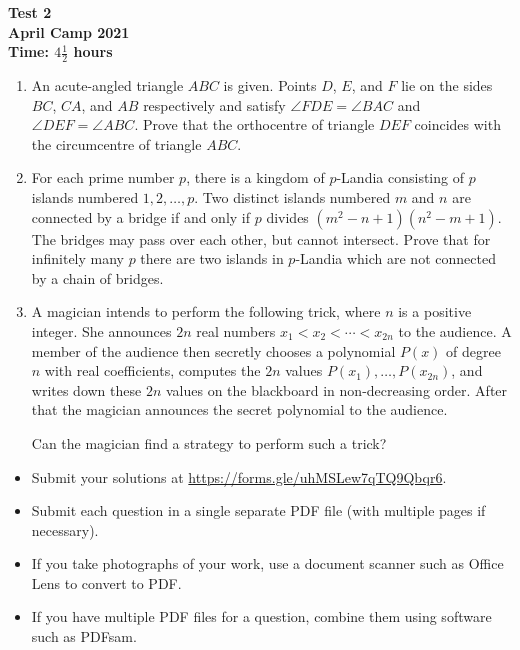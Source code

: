 \documentclass{article}
\begin{document}
\thispagestyle{empty}

\begin{center}
  \textbf{\Large Test 2}
  \\ \vspace{1em}
  \textbf{\large April Camp 2021}
  \\ \vspace{1em}
  \textbf{\large Time: $4\frac{1}{2}$ hours}
\end{center}

\vfill

\begin{enumerate}[leftmargin=0pt, itemsep=18pt]

\item %
An acute-angled triangle $ABC$ is given.
Points $D$, $E$, and $F$ lie on the sides $BC$, $CA$, and $AB$ respectively and satisfy $\angle FDE = \angle BAC$ and $\angle DEF = \angle ABC$.
Prove that the orthocentre of triangle $DEF$ coincides with the circumcentre of triangle $ABC$.


\item %
For each prime number $p$, there is a kingdom of $p$-Landia consisting of $p$ islands numbered $1, 2, \dotsc, p$.
Two distinct islands numbered $m$ and $n$ are connected by a bridge if and only if $p$ divides $(m^2-n+1) (n^2-m+1)$.
The bridges may pass over each other, but cannot intersect.
Prove that for infinitely many $p$ there are two islands in $p$-Landia which are not connected by a chain of bridges.


\item %
A magician intends to perform the following trick, where $n$ is a positive integer.
She announces $2n$ real numbers $x_1 < x_2 < \dotsb < x_{2n}$ to the audience.
A member of the audience then secretly chooses a polynomial $P(x)$ of degree $n$ with real coefficients, computes the $2n$ values $P(x_1), \dotsc, P(x_{2n})$, and writes down these $2n$ values on the blackboard in non-decreasing order.
After that the magician announces the secret polynomial to the audience.

Can the magician find a strategy to perform such a trick?

\end{enumerate}


\vfill
\vfill
\begin{itemize}
	\item Submit your solutions at \url{https://forms.gle/uhMSLew7qTQ9Qbqr6}.
	\item Submit each question in a single separate PDF file (with multiple pages if necessary).
	\item If you take photographs of your work, use a document scanner such as Office Lens to convert to PDF.
	\item If you have multiple PDF files for a question, combine them using software such as PDFsam.
\end{itemize}
\end{document}
